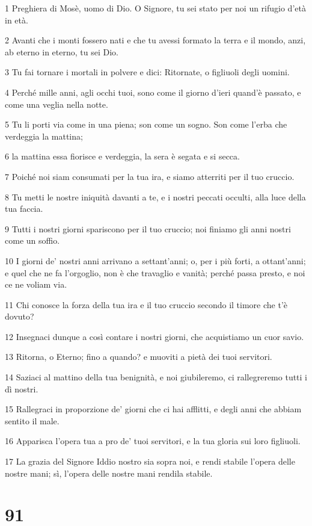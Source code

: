 \par 1 Preghiera di Mosè, uomo di Dio. O Signore, tu sei stato per noi un rifugio d'età in età.
\par 2 Avanti che i monti fossero nati e che tu avessi formato la terra e il mondo, anzi, ab eterno in eterno, tu sei Dio.
\par 3 Tu fai tornare i mortali in polvere e dici: Ritornate, o figliuoli degli uomini.
\par 4 Perché mille anni, agli occhi tuoi, sono come il giorno d'ieri quand'è passato, e come una veglia nella notte.
\par 5 Tu li porti via come in una piena; son come un sogno. Son come l'erba che verdeggia la mattina;
\par 6 la mattina essa fiorisce e verdeggia, la sera è segata e si secca.
\par 7 Poiché noi siam consumati per la tua ira, e siamo atterriti per il tuo cruccio.
\par 8 Tu metti le nostre iniquità davanti a te, e i nostri peccati occulti, alla luce della tua faccia.
\par 9 Tutti i nostri giorni spariscono per il tuo cruccio; noi finiamo gli anni nostri come un soffio.
\par 10 I giorni de' nostri anni arrivano a settant'anni; o, per i più forti, a ottant'anni; e quel che ne fa l'orgoglio, non è che travaglio e vanità; perché passa presto, e noi ce ne voliam via.
\par 11 Chi conosce la forza della tua ira e il tuo cruccio secondo il timore che t'è dovuto?
\par 12 Insegnaci dunque a così contare i nostri giorni, che acquistiamo un cuor savio.
\par 13 Ritorna, o Eterno; fino a quando? e muoviti a pietà dei tuoi servitori.
\par 14 Saziaci al mattino della tua benignità, e noi giubileremo, ci rallegreremo tutti i dì nostri.
\par 15 Rallegraci in proporzione de' giorni che ci hai afflitti, e degli anni che abbiam sentito il male.
\par 16 Apparisca l'opera tua a pro de' tuoi servitori, e la tua gloria sui loro figliuoli.
\par 17 La grazia del Signore Iddio nostro sia sopra noi, e rendi stabile l'opera delle nostre mani; sì, l'opera delle nostre mani rendila stabile.

\chapter{91}

